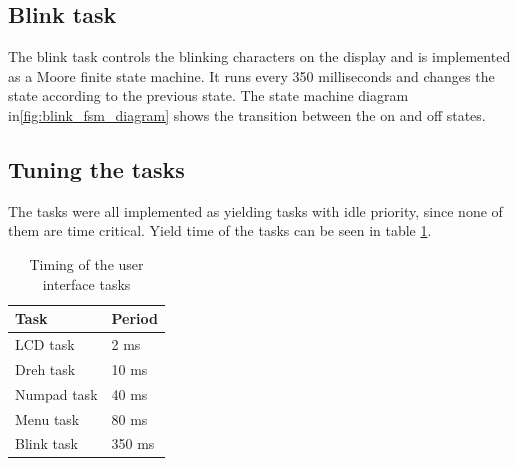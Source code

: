 \subsection{Blink task}
The blink task controls the blinking characters on the display and is implemented as a Moore finite state machine. It runs every 350 milliseconds and changes the state according to the previous state. The state machine diagram in\ref{fig:blink_fsm_diagram} shows the transition between the on and off states.

\subsection{Tuning the tasks}
The tasks were all implemented as yielding tasks with idle priority, since none of them are time critical. Yield time of the tasks can be seen in table \ref{tab:ui_task_timing}.

\begin{table}[htb]	
	\begin{center}
	\begin{tabular}{l|l}					
	Task & Period \\					
	\hline							
LCD task & 2 ms \\
Dreh task  & 10 ms \\
Numpad task & 40 ms \\
Menu task & 80 ms \\
Blink task & 350 ms \\
	\end{tabular}
	\end{center}
	\caption{Timing of the user interface tasks}	
	\label{tab:ui_task_timing}				
\end{table}






















